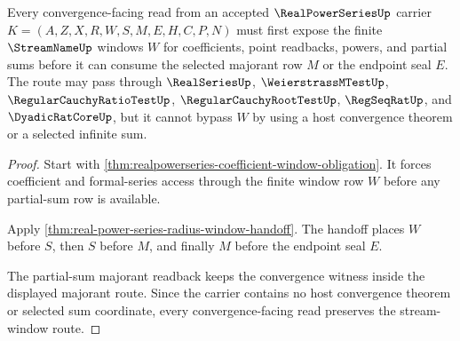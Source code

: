 \begin{theorem}
\label{thm:real-power-series-stream-window-convergence-route}
Every convergence-facing read from an accepted $\RealPowerSeriesUp$ carrier $K=(A,Z,X,R,W,S,M,E,H,C,P,N)$ must first expose the finite $\StreamNameUp$ windows $W$ for coefficients, point readbacks, powers, and partial sums before it can consume the selected majorant row $M$ or the endpoint seal $E$. The route may pass through $\RealSeriesUp$, $\WeierstrassMTestUp$, $\RegularCauchyRatioTestUp$, $\RegularCauchyRootTestUp$, $\RegSeqRatUp$, and $\DyadicRatCoreUp$, but it cannot bypass $W$ by using a host convergence theorem or a selected infinite sum.
\end{theorem}
\begin{proof}
Start with \autoref{thm:realpowerseries-coefficient-window-obligation}. It forces coefficient and formal-series access through the finite window row $W$ before any partial-sum row is available.

Apply \autoref{thm:real-power-series-radius-window-handoff}. The handoff places $W$ before $S$, then $S$ before $M$, and finally $M$ before the endpoint seal $E$.

The partial-sum majorant readback keeps the convergence witness inside the displayed majorant route. Since the carrier contains no host convergence theorem or selected sum coordinate, every convergence-facing read preserves the stream-window route.
\end{proof}

